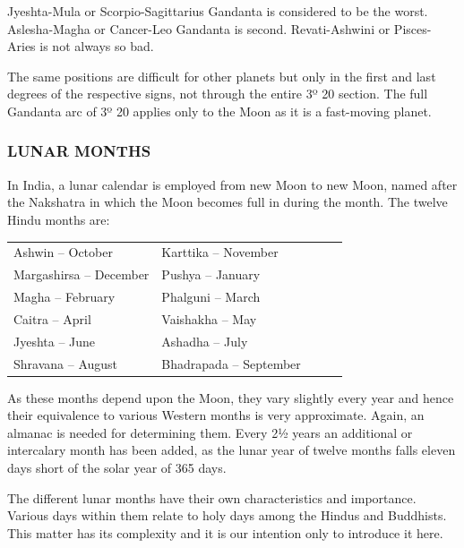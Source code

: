 \begin{enumerate}
\begin{enumerate}
Jyeshta-Mula or Scorpio-Sagittarius Gandanta is considered to be the worst. Aslesha-Magha or Cancer-Leo Gandanta is second. Revati-Ashwini or Pisces-Aries is not always so bad.

 

The same positions are difficult for other planets but only in the first and last degrees of the respective signs, not through the entire 3º 20 section. The full Gandanta arc of 3º 20 applies only to the Moon as it is a fast-moving planet.

 

\subsubsection{LUNAR MONTHS}
In India, a lunar calendar is employed from new Moon to new Moon, named after the Nakshatra in which the Moon becomes full in during the month. The twelve Hindu months are:

 
\begin{center}
\begin{tabular}{ l l l}
Ashwin – October	&Karttika – November                              \\
Margashirsa – December	&Pushya – January                             \\
Magha – February	&Phalguni – March                             \\
Caitra – April	&Vaishakha – May                             \\
Jyeshta – June	&Ashadha – July                             \\
Shravana – August	&Bhadrapada – September                             \\
   \end{tabular}
\end{center} 

As these months depend upon the Moon, they vary slightly every year and hence their equivalence to various Western months is very approximate. Again, an almanac is needed for determining them. Every 2½ years an additional or intercalary month has been added, as the lunar year of twelve months falls eleven days short of the solar year of 365 days.

 

The different lunar months have their own characteristics and importance. Various days within them relate to holy days among the Hindus and Buddhists. This matter has its complexity and it is our intention only to introduce it here.


\end{enumerate}
\end{enumerate}

